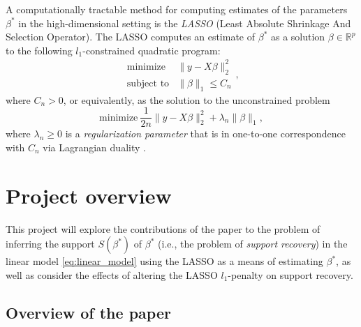 \documentclass[letterpaper,12pt]{article}
\newcommand{\norm}[1]{\lVert#1\rVert}
\begin{document}
A computationally tractable method for computing estimates of the
parameters $\beta^\ast$ in the high-dimensional setting is the
\textit{LASSO} \cite{tibshirani96} (Least Absolute Shrinkage And
Selection Operator). The LASSO computes an estimate of $\beta^\ast$ as
a solution $\beta \in \mathbb{R}^p$ to the following $l_1$-constrained
quadratic program:
\begin{equation} \label{eq:constrained_problem}
  \begin{array}{ll}
    \text{minimize} & \norm{y - X\beta}_2^2 \\
    \text{subject to}
      & \norm{\beta}_1 \leq C_n
  \end{array},
\end{equation}
where $C_n > 0$, or equivalently, as the solution to the unconstrained
problem
\begin{equation} \label{eq:unconstrained_problem}
  \text{minimize} \
    \frac{1}{2n} \norm{y - X\beta}_2^2 + \lambda_n \norm{\beta}_1,
\end{equation}
where $\lambda_n \geq 0$ is a \textit{regularization parameter} that
is in one-to-one correspondence with $C_n$ via Lagrangian duality
\cite{wainwright06}.

\section*{Project overview}

This project will explore the contributions of the paper
\cite{wainwright06} to the problem of inferring the support
$S(\beta^\ast)$ of $\beta^\ast$ (i.e., the problem of \textit{support
  recovery}) in the linear model \eqref{eq:linear_model} using the
LASSO as a means of estimating $\beta^\ast$, as well as consider the
effects of altering the LASSO $l_1$-penalty on support recovery.

\subsection*{Overview of the paper}
\end{document}
